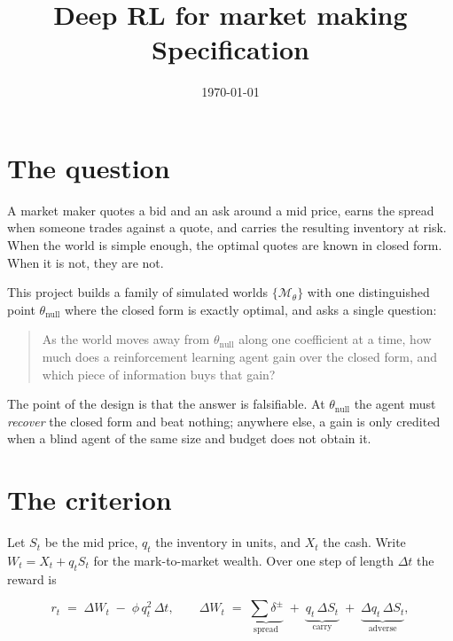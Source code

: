 \documentclass[11pt,a4paper]{article}
\title{\bfseries Deep RL for market making\\[2pt]\large Specification}
\author{}\date{\today}
\newcommand{\dt}{\Delta t}
\newcommand{\thnull}{\theta_{\mathrm{null}}}
\begin{document}
\maketitle\vspace{-2.2em}

\section{The question}

A market maker quotes a bid and an ask around a mid price, earns the spread when
someone trades against a quote, and carries the resulting inventory at risk. When
the world is simple enough, the optimal quotes are known in closed form. When it
is not, they are not.

This project builds a family of simulated worlds $\{\mathcal{M}_\theta\}$ with one
distinguished point $\thnull$ where the closed form is exactly optimal, and asks a
single question:

\begin{quote}
As the world moves away from $\thnull$ along one coefficient at a time, how much
does a reinforcement learning agent gain over the closed form, and which piece of
information buys that gain?
\end{quote}

The point of the design is that the answer is falsifiable. At $\thnull$ the agent
must \emph{recover} the closed form and beat nothing; anywhere else, a gain is
only credited when a blind agent of the same size and budget does not obtain it.

\section{The criterion}

Let $S_t$ be the mid price, $q_t$ the inventory in units, and $X_t$ the cash.
Write $W_t = X_t + q_t S_t$ for the mark-to-market wealth. Over one step of length
$\dt$ the reward is

\begin{equation}
  r_t \;=\; \Delta W_t \;-\; \phi\, q_t^2\, \dt ,
  \qquad
  \Delta W_t \;=\; \underbrace{\textstyle\sum \delta^{\pm}}_{\text{spread}}
  \;+\; \underbrace{q_t\,\Delta S_t}_{\text{carry}}
  \;+\; \underbrace{\Delta q_t\,\Delta S_t}_{\text{adverse}} ,
\end{equation}
\end{document}
